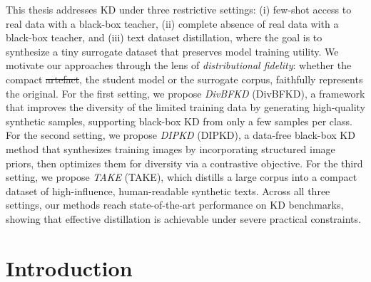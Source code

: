 \documentclass[12pt, a4paper, twoside]{book}
\makeatletter
\numberwithin{equation}{chapter}
\theoremstyle{plain}
\theoremstyle{definition}
\theoremstyle{remark}
\newenvironment{foldable}{}{}
\providecommand{\DIFaddtex}[1]{{\protect\color{blue}\uwave{#1}}} %
\providecommand{\DIFdeltex}[1]{{\protect\color{red}\sout{#1}}} %
\providecommand{\DIFaddbegin}{} %
\providecommand{\DIFaddend}{} %
\providecommand{\DIFdelbegin}{} %
\providecommand{\DIFdelend}{} %
\providecommand{\DIFadd}[1]{\texorpdfstring{\DIFaddtex{#1}}{#1}} %
\providecommand{\DIFdel}[1]{\texorpdfstring{\DIFdeltex{#1}}{}} %
\newcommand{\DIFscaledelfig}{0.5}
\newlength{\DIFdelgraphicswidth} %
\newlength{\DIFdelgraphicsheight} %
\newcommand{\DIFaddincludegraphics}[2][]{{\color{blue}\fbox{\DIFOincludegraphics[#1]{#2}}}} %
\newcommand{\DIFdelincludegraphics}[2][]{%
\sbox{\DIFdelgraphicsbox}{\DIFOincludegraphics[#1]{#2}}%
\settoboxwidth{\DIFdelgraphicswidth}{\DIFdelgraphicsbox} %
\settoboxtotalheight{\DIFdelgraphicsheight}{\DIFdelgraphicsbox} %
\scalebox{\DIFscaledelfig}{%
\parbox[b]{\DIFdelgraphicswidth}{\usebox{\DIFdelgraphicsbox}\\[-\baselineskip] \rule{\DIFdelgraphicswidth}{0em}}\llap{\resizebox{\DIFdelgraphicswidth}{\DIFdelgraphicsheight}{%
\setlength{\unitlength}{\DIFdelgraphicswidth}%
\begin{picture}(1,1)%
\thicklines\linethickness{2pt} %
{\color[rgb]{1,0,0}\put(0,0){\framebox(1,1){}}}%
{\color[rgb]{1,0,0}\put(0,0){\line( 1,1){1}}}%
{\color[rgb]{1,0,0}\put(0,1){\line(1,-1){1}}}%
\end{picture}%
}\hspace*{3pt}}} %
} %
\DeclareRobustCommand{\DIFaddbegin}{\DIFOaddbegin \let\includegraphics\DIFaddincludegraphics} %
\DeclareRobustCommand{\DIFaddend}{\DIFOaddend \let\includegraphics\DIFOincludegraphics} %
\DeclareRobustCommand{\DIFdelbegin}{\DIFOdelbegin \let\includegraphics\DIFdelincludegraphics} %
\DeclareRobustCommand{\DIFdelend}{\DIFOaddend \let\includegraphics\DIFOincludegraphics} %
\let\sout@orig\sout %
\renewcommand{\sout}[1]{\ifmmode\text{\sout@orig{\ensuremath{#1}}}\else\sout@orig{#1}\fi} %
\makeatother
\begin{document}
\begin{foldable}
  This thesis addresses \ac{KD} under three restrictive settings: (i) few-shot access to real data with a black-box teacher, (ii) complete absence of real data with a black-box teacher, and (iii) text dataset distillation, where the goal is to synthesize a tiny surrogate dataset that preserves model training utility.
  We motivate our approaches through the lens of \textit{distributional fidelity}: whether the compact \DIFdelbegin \DIFdel{artefact}\DIFdelend \DIFaddbegin \DIFadd{artifact}\DIFaddend , the student model or the surrogate corpus, faithfully represents the original.
  For the first setting, we propose \textit{\acl{DivBFKD}} (\ac{DivBFKD}), a framework that improves the diversity of the limited training data by generating high-quality synthetic samples, supporting black-box \ac{KD} from only a few samples per class.
  For the second setting, we propose \textit{\acl{DIPKD}} (\ac{DIPKD}), a data-free black-box \ac{KD} method that synthesizes training images by incorporating structured image priors, then optimizes them for diversity via a contrastive objective.
  For the third setting, we propose \textit{\acl{TAKE}} (\ac{TAKE}), which distills a large corpus into a compact dataset of high-influence, human-readable synthetic texts.
  Across all three settings, our methods reach state-of-the-art performance on \ac{KD} benchmarks, showing that effective distillation is achievable under severe practical constraints.
\end{foldable}

\cleardoublepage
\tableofcontents
\listoffigures
\listoftables
\printacronyms
\clearpage{}

\mainmatter
\clearpage{}\acresetall

\chapter{Introduction} \label{ch:10-introduction}
\end{document}
